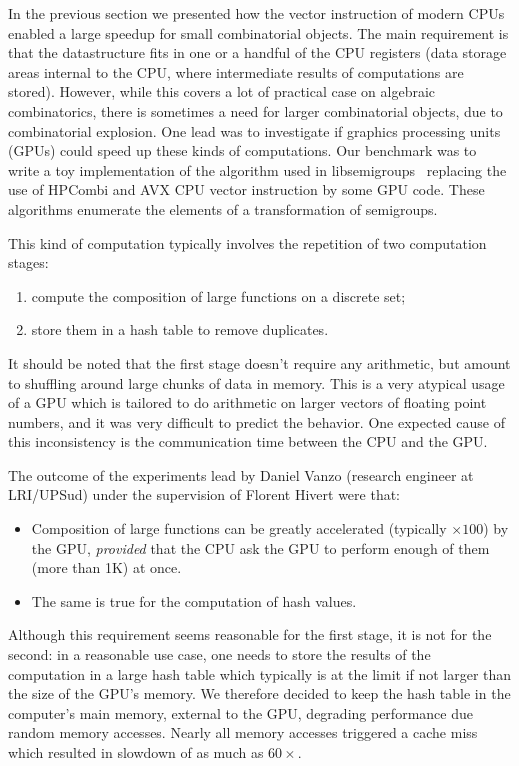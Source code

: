 \documentclass{deliverablereport}
\begin{document}
In the previous section we presented how the vector instruction of modern
CPUs enabled a large speedup for small combinatorial objects. The main
requirement is that the datastructure fits in one or a
handful of the CPU registers (data storage areas internal to the CPU, where
intermediate results of computations are stored). However, while this
covers a lot of practical case on algebraic combinatorics,  there is sometimes a
need for larger combinatorial objects, due to combinatorial
explosion. One lead was to investigate if graphics
processing units (GPUs) could speed up these kinds of computations. Our benchmark was to write a
toy implementation of the algorithm used in libsemigroups~\cite{libsemigroups}
replacing the use of HPCombi and AVX CPU vector instruction by some GPU
code. These algorithms enumerate the elements of a transformation of semigroups.

This kind of computation typically involves the repetition of two computation
stages:
\begin{enumerate}
\item compute the composition of large functions on a discrete set;
\item store them in a hash table to remove duplicates.
\end{enumerate}
It should be noted that the first stage doesn't require any arithmetic, but
amount to shuffling around large chunks of data in memory. This is a very atypical usage of a
GPU which is tailored to do arithmetic on larger vectors of floating point numbers, and it was very difficult
to predict the behavior. One expected cause of this inconsistency is the communication time
between the CPU and the GPU.
\medskip

The outcome of the experiments lead by Daniel Vanzo (research engineer at
LRI/UPSud) under the supervision of Florent Hivert were that:
\begin{itemize}
\item Composition of large functions can be greatly accelerated (typically
$\times 100$) by the GPU, \emph{provided} that the CPU ask the GPU to perform
enough of them (more than 1K) at once.
\item The same is true for the computation of hash values.
\end{itemize}
Although this requirement seems reasonable for the first stage, it is not for
the second: in a reasonable use case, one needs to store the results of the
computation in a large hash table which typically is at the limit if not
larger than the size of the GPU's memory. We  therefore decided to keep the hash table
in the computer's main memory, external to the GPU, degrading performance due
random memory accesses. Nearly all
memory accesses triggered a cache miss which resulted in slowdown of as much as
$60\times$. \bigskip
\end{document}
